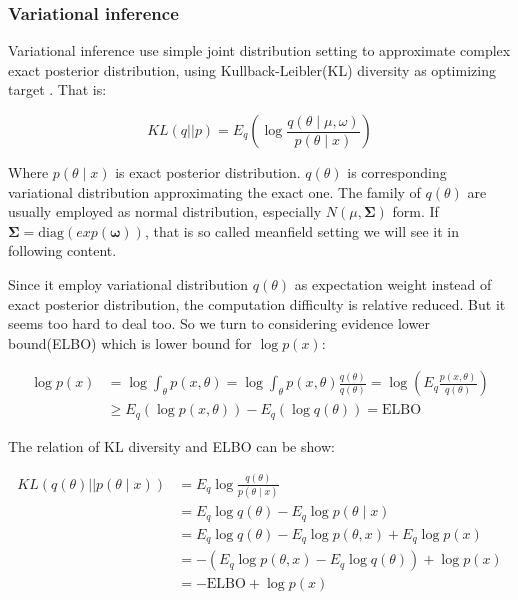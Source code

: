 \documentclass{article}
\begin{document}
\subsubsection{Variational inference}

Variational inference use simple joint distribution setting to approximate complex 
exact posterior distribution, using Kullback-Leibler(KL) diversity as optimizing target \cite{blei2017variational}. That is:

$$
KL(q||p) = E_q \left( \log \frac{q(\theta \mid \mu,\omega)}{p(\theta \mid x)} \right)
$$

Where $p(\theta \mid x)$ is exact posterior distribution. 
$q(\theta)$ is corresponding variational distribution approximating the exact one.
The family of $q(\theta)$ are usually employed as normal distribution, especially $N(\mu,\mathbf{\Sigma})$ form.
If $\mathbf{\Sigma}=\mathrm{diag}(exp(\mathbf{\omega}))$, 
that is so called meanfield setting we will see it in following content.

Since it employ variational distribution $q(\theta)$ as expectation weight 
instead of exact posterior distribution,
the computation difficulty is relative reduced. But it seems too hard to deal too. So 
we turn to considering evidence lower bound(ELBO) which is lower bound for $\log p(x)$:

\begin{align*}
\log p(x) &= \log \int_\theta p(x,\theta) = \log \int_\theta p(x,\theta) \frac{q(\theta)}{q(\theta)} = \log \left( E_q \frac{p(x,\theta)}{q(\theta)} \right)  \\
          &\ge E_q (\log p(x,\theta)) - E_q(\log q(\theta)) = \mathrm{ELBO}
\end{align*}

The relation of KL diversity and ELBO can be show:

\begin{align*}
KL(q(\theta) || p(\theta \mid x)) &= E_q \log \frac{q(\theta)}{p(\theta \mid x)}  \\
                                  &= E_q \log q(\theta) - E_q \log p(\theta \mid x) \\
                                  &= E_q \log q(\theta) - E_q \log p(\theta,x) + E_q \log p(x) \\
                                  &= -(E_q \log p(\theta,x) -E_q \log q(\theta)) + \log p(x) \\
                                  &= -\mathrm{ELBO} + \log p(x)
\end{align*}
\end{document}
